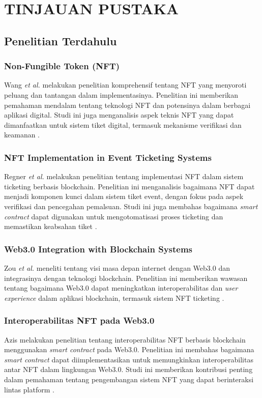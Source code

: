 \setlength{\parindent}{1cm}    %
\setlength{\parskip}{1em}      %
\sloppy  %
\chapter{TINJAUAN PUSTAKA}

\section{Penelitian Terdahulu}

\subsection{Non-Fungible Token (NFT)}
Wang \textit{et al.} melakukan penelitian komprehensif tentang NFT yang menyoroti peluang dan tantangan dalam implementasinya. Penelitian ini memberikan pemahaman mendalam tentang teknologi NFT dan potensinya dalam berbagai aplikasi digital. Studi ini juga menganalisis aspek teknis NFT yang dapat dimanfaatkan untuk sistem tiket digital, termasuk mekanisme verifikasi dan keamanan \parencite{ref1}.

\subsection{NFT Implementation in Event Ticketing Systems}
Regner \textit{et al.} melakukan penelitian tentang implementasi NFT dalam sistem ticketing berbasis blockchain. Penelitian ini menganalisis bagaimana NFT dapat menjadi komponen kunci dalam sistem tiket event, dengan fokus pada aspek verifikasi dan pencegahan pemalsuan. Studi ini juga membahas bagaimana \textit{smart contract} dapat digunakan untuk mengotomatisasi proses ticketing dan memastikan keabsahan tiket \parencite{ref3}.

\subsection{Web3.0 Integration with Blockchain Systems}
Zou \textit{et al.} meneliti tentang visi masa depan internet dengan Web3.0 dan integrasinya dengan teknologi blockchain. Penelitian ini memberikan wawasan tentang bagaimana Web3.0 dapat meningkatkan interoperabilitas dan \textit{user experience} dalam aplikasi blockchain, termasuk sistem NFT ticketing \parencite{ref5}.

\subsection{Interoperabilitas NFT pada Web3.0}
Azis melakukan penelitian tentang interoperabilitas NFT berbasis blockchain menggunakan \textit{smart contract} pada Web3.0. Penelitian ini membahas bagaimana \textit{smart contract} dapat diimplementasikan untuk memungkinkan interoperabilitas antar NFT dalam lingkungan Web3.0. Studi ini memberikan kontribusi penting dalam pemahaman tentang pengembangan sistem NFT yang dapat berinteraksi lintas platform \parencite{ref8}.

